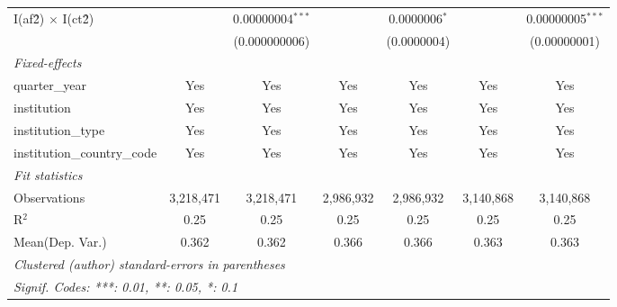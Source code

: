 \begin{tabular}{lcccccc}
   I(af\^2) $\times$ I(ct\^2)         &               & 0.00000004$^{***}$ &               & 0.0000006$^{*}$  &               & 0.00000005$^{***}$\\   
                                      &               & (0.000000006)      &               & (0.0000004)      &               & (0.00000001)\\   
   \midrule
   \emph{Fixed-effects}\\
   quarter\_year                      & Yes           & Yes                & Yes           & Yes              & Yes           & Yes\\  
   institution                        & Yes           & Yes                & Yes           & Yes              & Yes           & Yes\\  
   institution\_type                  & Yes           & Yes                & Yes           & Yes              & Yes           & Yes\\  
   institution\_country\_code         & Yes           & Yes                & Yes           & Yes              & Yes           & Yes\\  
   \midrule
   \emph{Fit statistics}\\
   Observations                       & 3,218,471     & 3,218,471          & 2,986,932     & 2,986,932        & 3,140,868     & 3,140,868\\  
   R$^2$                              & 0.25          & 0.25               & 0.25          & 0.25             & 0.25          & 0.25\\  
Mean(Dep. Var.) & 0.362 & 0.362 & 0.366 & 0.366 & 0.363 & 0.363 \\
   \midrule \midrule
   \multicolumn{7}{l}{\emph{Clustered (author) standard-errors in parentheses}}\\
   \multicolumn{7}{l}{\emph{Signif. Codes: ***: 0.01, **: 0.05, *: 0.1}}\\
\end{tabular}
\par\endgroup
